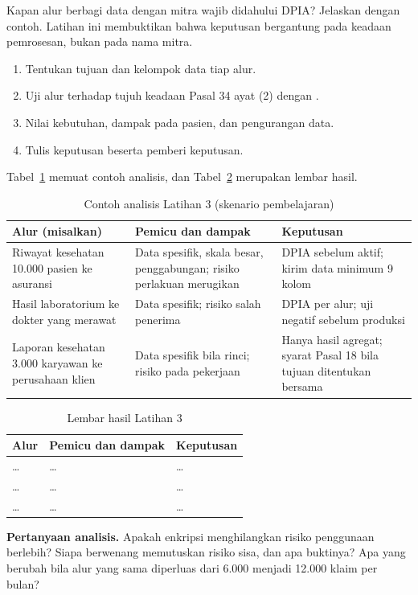 Kapan alur berbagi data dengan mitra wajib didahului DPIA? Jelaskan dengan contoh. Latihan ini
membuktikan bahwa keputusan bergantung pada keadaan pemrosesan, bukan pada nama mitra.

\begin{enumerate}
  \item Tentukan tujuan dan kelompok data tiap alur.
  \item Uji alur terhadap tujuh keadaan Pasal 34 ayat (2) dengan
  .
  \item Nilai kebutuhan, dampak pada pasien, dan pengurangan data.
  \item Tulis keputusan beserta pemberi keputusan.
\end{enumerate}

Tabel~\ref{tab:ch09-lat3-contoh} memuat contoh analisis, dan Tabel~\ref{tab:ch09-lat3-hasil}
merupakan lembar hasil.

\begin{table}[!htb]
  \centering\small
  \caption{Contoh analisis Latihan 3 (skenario pembelajaran)}\label{tab:ch09-lat3-contoh}
  \begin{tabularx}{\textwidth}{|>{\raggedright\arraybackslash}X|>{\raggedright\arraybackslash}X|>{\raggedright\arraybackslash}X|}
    \hline
    \textbf{Alur (misalkan)} & \textbf{Pemicu dan dampak} & \textbf{Keputusan} \\ \hline
    Riwayat kesehatan 10.000 pasien ke asuransi & Data spesifik, skala besar, penggabungan; risiko
    perlakuan merugikan & DPIA sebelum aktif; kirim data minimum 9 kolom \\ \hline
    Hasil laboratorium ke dokter yang merawat & Data spesifik; risiko salah penerima & DPIA per
    alur; uji negatif sebelum produksi \\ \hline
    Laporan kesehatan 3.000 karyawan ke perusahaan klien & Data spesifik bila rinci; risiko pada
    pekerjaan & Hanya hasil agregat; syarat Pasal 18 bila tujuan ditentukan bersama \\ \hline
  \end{tabularx}
\end{table}

\begin{table}[!htb]
  \centering\small
  \caption{Lembar hasil Latihan 3}\label{tab:ch09-lat3-hasil}
  \begin{tabularx}{\textwidth}{|>{\raggedright\arraybackslash}X|>{\raggedright\arraybackslash}X|>{\raggedright\arraybackslash}X|}
    \hline
    \textbf{Alur} & \textbf{Pemicu dan dampak} & \textbf{Keputusan} \\ \hline
    \dots & \dots & \dots \\ \hline
    \dots & \dots & \dots \\ \hline
    \dots & \dots & \dots \\ \hline
  \end{tabularx}
\end{table}

\textbf{Pertanyaan analisis.} Apakah enkripsi menghilangkan risiko penggunaan berlebih? Siapa
berwenang memutuskan risiko sisa, dan apa buktinya? Apa yang berubah bila alur yang sama diperluas
dari 6.000 menjadi 12.000 klaim per bulan?
